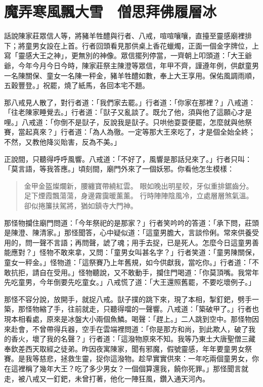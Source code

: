 
\chapter{魔弄寒風飄大雪　僧思拜佛履層冰}

話說陳家莊眾信人等，將豬羊牲醴與行者、八戒，喧喧嚷嚷，直擡至靈感廟裡排下；將童男女設在上首。行者回頭看見那供桌上香花蠟燭，正面一個金字牌位，上寫「靈感大王之神」，更無別的神像。眾信擺列停當，一齊朝上叩頭道：「大王爺爺，今年今月今日今時，陳家莊祭主陳澄等眾信，年甲不齊，謹遵年例，供獻童男一名陳關保、童女一名陳一秤金，豬羊牲醴如數，奉上大王享用。保佑風調雨順，五穀豐登。」祝罷，燒了紙馬，各回本宅不題。

那八戒見人散了，對行者道：「我們家去罷。」行者道：「你家在那裡？」八戒道：「往老陳家睡覺去。」行者道：「獃子又亂談了。既允了他，須與他了這願心才是哩。」八戒道：「你倒不是獃子，反說我是獃子。只哄他耍耍便罷，怎麼就與他祭賽，當起真來？」行者道：「為人為徹。一定等那大王來吃了，才是個全始全終；不然，又教他降災貽害，反為不美。」

正說間，只聽得呼呼風響。八戒道：「不好了，風響是那話兒來了。」行者只叫：「莫言語，等我答應。」頃刻間，廟門外來了一個妖邪。你看他怎生模樣：
\begin{quote}
金甲金盔燦爛新，腰纏寶帶繞紅雲。
眼如晚出明星皎，牙似重排鋸齒分。
足下煙霞飄蕩蕩，身邊霧靄暖薰薰。
行時陣陣陰風冷，立處層層煞氣溫。
卻似捲簾扶駕將，猶如鎮寺大門神。
\end{quote}

那怪物攔住廟門問道：「今年祭祀的是那家？」行者笑吟吟的答道：「承下問，莊頭是陳澄、陳清家。」那怪聞答，心中疑似道：「這童男膽大，言談伶俐。常來供養受用的，問一聲不言語；再問聲，諕了魂；用手去捉，已是死人。怎麼今日這童男善能應對？」怪物不敢來拿，又問：「童男女叫甚名字？」行者笑道：「童男陳關保，童女一秤金。」怪物道：「這祭賽乃上年舊規，如今供獻我，當吃你。」行者道：「不敢抗拒，請自在受用。」怪物聽說，又不敢動手，攔住門喝道：「你莫頂嘴。我常年先吃童男，今年倒要先吃童女。」八戒慌了道：「大王還照舊罷，不要吃壞例子。」

那怪不容分說，放開手，就捉八戒。獃子撲的跳下來，現了本相，掣釘鈀，劈手一築，那怪物縮了手，往前就走，只聽得噹的一聲響。八戒道：「築破甲了。」行者也現本相看處，原來是冰盤大小兩個魚鱗。喝聲：「趕上。」二人跳到空中。那怪物因來赴會，不曾帶得兵器，空手在雲端裡問道：「你是那方和尚，到此欺人，破了我的香火，壞了我的名聲？」行者道：「這潑物原來不知。我等乃東土大唐聖僧三藏奉欽差西天取經之徒弟。昨因夜寓陳家，聞有邪魔，假號靈感，年年要童男女祭賽。是我等慈悲，拯救生靈，捉你這潑物。趁早實實供來：一年吃兩個童男女，你在這裡稱了幾年大王？吃了多少男女？一個個算還我，饒你死罪。」那怪聞言就走，被八戒又一釘鈀，未曾打著，他化一陣狂風，鑽入通天河內。

